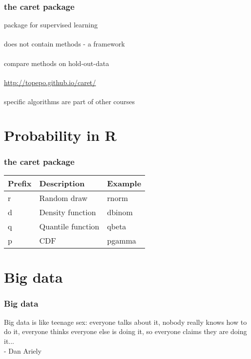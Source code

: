 \documentclass{beamer}
\begin{document}
\begin{frame}
	\frametitle{the caret package}
	\begin{center}
		package for supervised learning\\~\\
		does not contain methods - a framework\\~\\
		compare methods on hold-out-data\\~\\
		\href{http://topepo.github.io/caret/}{http://topepo.github.io/caret/}\\~\\
		specific algorithms are part of other courses
	\end{center}
\end{frame}

\section{Probability in R}

\begin{frame}
	\frametitle{the caret package}
	\begin{center}
	\begin{table}
		\begin{tabular}{l | l | l}
			\textbf{Prefix} & \textbf{Description} & \textbf{Example}\\
			\hline
			r & Random draw & rnorm \\
			\hline
			d & Density function & dbinom \\
			\hline
			q & Quantile function & qbeta \\
			\hline
			p & CDF & pgamma \\
		\end{tabular}
	\end{table}
\end{center}
\end{frame}

\section{Big data}

\begin{frame}
	\frametitle{Big data}
	Big data is like teenage sex:
	everyone talks about it,
	nobody really knows how to do it,
	everyone thinks everyone else is doing it,
	so everyone claims they are doing it...\\
	- Dan Ariely
\end{frame}
\end{document}
